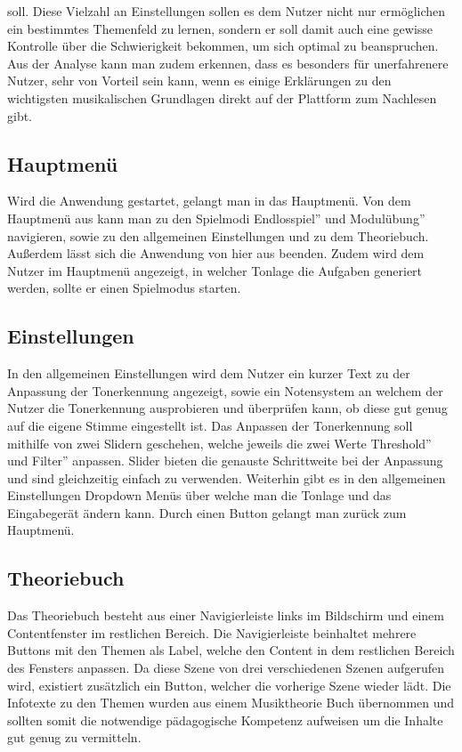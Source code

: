 soll. Diese Vielzahl an Einstellungen sollen es dem Nutzer nicht nur ermöglichen ein bestimmtes Themenfeld zu lernen, sondern er soll damit auch eine gewisse Kontrolle über die Schwierigkeit bekommen, um sich optimal zu beanspruchen. Aus der Analyse kann man zudem erkennen, dass es besonders für unerfahrenere Nutzer, sehr von Vorteil sein kann, wenn es einige Erklärungen zu den wichtigsten musikalischen Grundlagen direkt auf der Plattform zum Nachlesen gibt. 

\subsection{Hauptmenü}
Wird die Anwendung gestartet, gelangt man in das Hauptmenü. Von dem Hauptmenü aus kann man zu den Spielmodi \glqq Endlosspiel'' und \glqq Modulübung'' navigieren, sowie zu den allgemeinen Einstellungen und zu dem Theoriebuch. Außerdem lässt sich die Anwendung von hier aus beenden. Zudem wird dem Nutzer im Hauptmenü angezeigt, in welcher Tonlage die Aufgaben generiert werden, sollte er einen Spielmodus starten.

\subsection{Einstellungen}
In den allgemeinen Einstellungen wird dem Nutzer ein kurzer Text zu der Anpassung der Tonerkennung angezeigt, sowie ein Notensystem an welchem der Nutzer die Tonerkennung ausprobieren und überprüfen kann, ob diese gut genug auf die eigene Stimme eingestellt ist. Das Anpassen der Tonerkennung soll mithilfe von zwei Slidern geschehen, welche jeweils die zwei Werte \glqq Threshold'' und \glqq Filter'' anpassen. Slider bieten die genauste Schrittweite bei der Anpassung und sind gleichzeitig einfach zu verwenden. Weiterhin gibt es in den allgemeinen Einstellungen Dropdown Menüs über welche man die Tonlage und das Eingabegerät ändern kann. Durch einen Button gelangt man zurück zum Hauptmenü.

\subsection{Theoriebuch}
Das Theoriebuch besteht aus einer Navigierleiste links im Bildschirm und einem Contentfenster im restlichen Bereich. Die Navigierleiste beinhaltet mehrere Buttons mit den Themen als Label, welche den Content in dem restlichen Bereich des Fensters anpassen. Da diese Szene von drei verschiedenen Szenen aufgerufen wird, existiert zusätzlich ein Button, welcher die vorherige Szene wieder lädt. Die Infotexte zu den Themen wurden aus einem Musiktheorie Buch übernommen und sollten somit die notwendige pädagogische Kompetenz aufweisen um die Inhalte gut genug zu vermitteln. \cite{abcmusik} 

